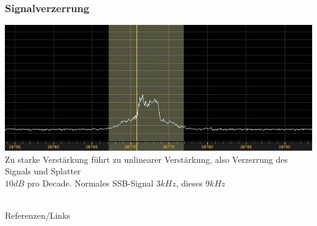 \begin{frame}
    \frametitle{Signalverzerrung}
        \begin{center}
        \includegraphics[width=1\textwidth,height=.6\textheight,keepaspectratio]{a07/splatter.jpg}\\[1em]
	Zu starke Verstärkung führt zu unlinearer Verstärkung, also Verzerrung des Signals und Splatter\\
     	$10dB$ pro Decade. Normales SSB-Signal $3kHz$, dieses $9kHz$
     \end{center}
\end{frame}

\renewcommand{\refname}{Referenzen}

\hypertarget{refs}{}
\textcolor{white}{} \\ %
\Large Referenzen/Links
\footnotesize

